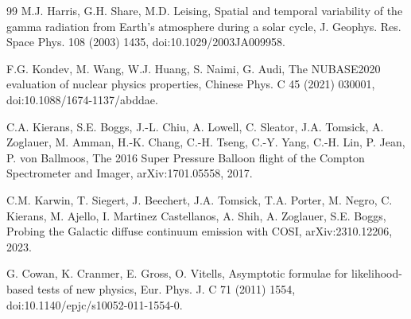 \documentclass[11pt]{article}
\begin{document}
\begin{thebibliography}{99}
M.J. Harris, G.H. Share, M.D. Leising, Spatial and temporal variability of the gamma radiation from Earth's atmosphere during a solar cycle, J. Geophys. Res. Space Phys. 108 (2003) 1435, doi:10.1029/2003JA009958.

F.G. Kondev, M. Wang, W.J. Huang, S. Naimi, G. Audi, The NUBASE2020 evaluation of nuclear physics properties, Chinese Phys. C 45 (2021) 030001, doi:10.1088/1674-1137/abddae.

C.A. Kierans, S.E. Boggs, J.-L. Chiu, A. Lowell, C. Sleator, J.A. Tomsick, A. Zoglauer, M. Amman, H.-K. Chang, C.-H. Tseng, C.-Y. Yang, C.-H. Lin, P. Jean, P. von Ballmoos, The 2016 Super Pressure Balloon flight of the Compton Spectrometer and Imager, arXiv:1701.05558, 2017.

C.M. Karwin, T. Siegert, J. Beechert, J.A. Tomsick, T.A. Porter, M. Negro, C. Kierans, M. Ajello, I. Martinez Castellanos, A. Shih, A. Zoglauer, S.E. Boggs, Probing the Galactic diffuse continuum emission with COSI, arXiv:2310.12206, 2023.

G. Cowan, K. Cranmer, E. Gross, O. Vitells, Asymptotic formulae for likelihood-based tests of new physics, Eur. Phys. J. C 71 (2011) 1554, doi:10.1140/epjc/s10052-011-1554-0.

\end{thebibliography}
\end{document}
